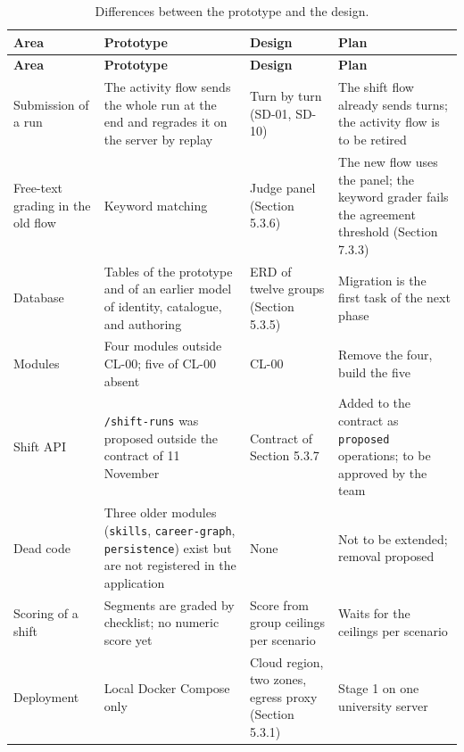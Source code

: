 {\small{}\renewcommand{\arraystretch}{1.1}
\begin{longtable}{|>{\raggedright\arraybackslash}p{}|>{\raggedright\arraybackslash}p{}|>{\raggedright\arraybackslash}p{}|>{\raggedright\arraybackslash}p{}|}
\caption{Differences between the prototype and the design.} \\
\hline
\textbf{Area} & \textbf{Prototype} & \textbf{Design} & \textbf{Plan} \\ \hline
\endfirsthead
\hline
\textbf{Area} & \textbf{Prototype} & \textbf{Design} & \textbf{Plan} \\ \hline
\endhead
Submission of a run & The activity flow sends the whole run at the end and regrades it on the server by replay & Turn by turn (SD-01, SD-10) & The shift flow already sends turns; the activity flow is to be retired \\ \hline
Free-text grading in the old flow & Keyword matching & Judge panel (Section 5.3.6) & The new flow uses the panel; the keyword grader fails the agreement threshold (Section 7.3.3) \\ \hline
Database & Tables of the prototype and of an earlier model of identity, catalogue, and authoring & ERD of twelve groups (Section 5.3.5) & Migration is the first task of the next phase \\ \hline
Modules & Four modules outside CL-00; five of CL-00 absent & CL-00 & Remove the four, build the five \\ \hline
Shift API & \texttt{/\allowbreak{}shift-\allowbreak{}runs} was proposed outside the contract of 11 November & Contract of Section 5.3.7 & Added to the contract as \texttt{proposed} operations; to be approved by the team \\ \hline
Dead code & Three older modules (\texttt{skills}, \texttt{career-\allowbreak{}graph}, \texttt{persistence}) exist but are not registered in the application & None & Not to be extended; removal proposed \\ \hline
Scoring of a shift & Segments are graded by checklist; no numeric score yet & Score from group ceilings per scenario & Waits for the ceilings per scenario \\ \hline
Deployment & Local Docker Compose only & Cloud region, two zones, egress proxy (Section 5.3.1) & Stage 1 on one university server \\ \hline
\end{longtable}
}

